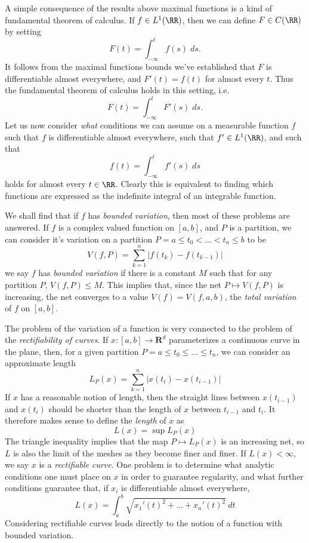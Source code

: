 A simple consequence of the results above maximal functions is a kind of fundamental theorem of calculus. If $f \in L^1(\RR)$, then we can define $F \in C(\RR)$ by setting
%
\[ F(t) = \int_{-\infty}^t f(s)\; ds. \]
%
It follows from the maximal functions bounds we've established that $F$ is differentiable almost everywhere, and $F'(t) = f(t)$ for almost every $t$. Thus the fundamental theorem of calculus holds in this setting, i.e.
%
\[ F(t) = \int_{-\infty}^t F'(s)\; ds. \]
%
Let us now consider \emph{what} conditions we can assume on a measurable function $f$ such that $f$ is differentiable almost everywhere, such that $f' \in L^1(\RR)$, and such that
%
\[ f(t) = \int_{-\infty}^t f'(s)\; ds \]
%
holds for almost every $t \in \RR$. Clearly this is equivalent to finding which functions are expressed as the indefinite integral of an integrable function.

We shall find that if $f$ has {\it bounded variation}, then most of these problems are answered. If $f$ is a complex valued function on $[a,b]$, and $P$ is a partition, we can consider it's variation on a partition $P = a \leq t_0 < \dots < t_n \leq b$ to be
%
\[ V(f,P) = \sum_{k = 1}^n |f(t_k) - f(t_{k-1})| \]
%
we say $f$ has \emph{bounded variation} if there is a constant $M$ such that for any partition $P$, $V(f,P) \leq M$. This implies that, since the net $P \mapsto V(f,P)$ is increasing, the net converges to a value $V(f) = V(f,a,b)$, the \emph{total variation} of $f$ on $[a,b]$.

The problem of the variation of a function is very connected to the problem of the {\it rectifiability of curves}. If $x: [a,b] \to \mathbf{R}^d$ parameterizes a continuous curve in the plane, then, for a given partition $P = a \leq t_0 \leq \dots \leq t_n$, we can consider an approximate length
%
\[ L_P(x) = \sum_{k = 1}^n |x(t_i) - x(t_{i-1})| \]
%
If $x$ has a reasonable notion of length, then the straight lines between $x(t_{i-1})$ and $x(t_i)$ should be shorter than the length of $x$ between $t_{i-1}$ and $t_i$. It therefore makes sense to define the \emph{length} of $x$ as
%
\[ L(x) = \sup L_P(x) \]
%
The triangle inequality implies that the map $P \mapsto L_P(x)$ is an increasing net, so $L$ is also the limit of the meshes as they become finer and finer. If $L(x) < \infty$, we say $x$ is a \emph{rectifiable curve}. One problem is to determine what analytic conditions one must place on $x$ in order to guarantee regularity, and what further conditions guarantee that, if $x_i$ is differentiable almost everywhere,
%
\[ L(x) = \int_a^b \sqrt{x_1'(t)^2 + \dots + x_n'(t)^2}\ dt \]
%
Considering rectifiable curves leads directly to the notion of a function with bounded variation.

